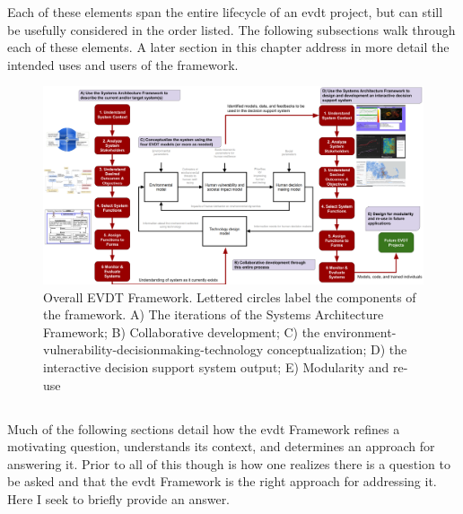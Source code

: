 Each of these elements span the entire lifecycle of an \ac{evdt} project, but can still be usefully considered in the order listed. The following subsections walk through each of these elements. A later section in this chapter address in more detail the intended uses and users of the framework.

\begin{landscape}
\begin{figure}[t]
	\centering
	\includegraphics[scale=0.225]{Figures/chap3/evdt_framework.png}
	\caption[Overall EVDT Framework]{Overall EVDT Framework. Lettered circles label the components of the framework. A) The iterations of the Systems Architecture Framework; B) Collaborative development; C) the environment-vulnerability-decisionmaking-technology conceptualization; D) the interactive decision support system output; E) Modularity and re-use}
	\label{fig:evdt_framework}
\end{figure}
\end{landscape}



\subsection{} \label{sec:initiate}

Much of the following sections detail how the \ac{evdt} Framework refines a motivating question, understands its context, and determines an approach for answering it. Prior to all of this though is how one realizes there is a question to be asked and that the \ac{evdt} Framework is the right approach for addressing it. Here I seek to briefly provide an answer.

